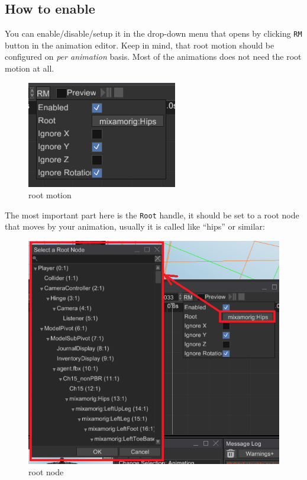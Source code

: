 \documentclass[
]{book}
\theoremstyle{definition}
\theoremstyle{definition}
\theoremstyle{definition}
\theoremstyle{definition}
\theoremstyle{remark}
\begin{document}
\subsection{How to enable}\label{how-to-enable}

You can enable/disable/setup it in the drop-down menu that opens by clicking \texttt{RM} button in the animation editor. Keep in mind, that root motion should be configured on \emph{per animation} basis. Most of the animations does not need the root motion at all.

\begin{figure}
\centering
\includegraphics{images/animation/ae_rm.png}
\caption{root motion}
\end{figure}

The most important part here is the \texttt{Root} handle, it should be set to a root node that moves by your animation, usually it is called like ``hips'' or similar:

\begin{figure}
\centering
\includegraphics{images/animation/ae_root_node.png}
\caption{root node}
\end{figure}
\end{document}

